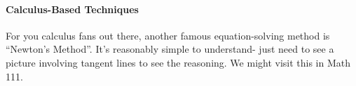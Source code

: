 \paragraph{Calculus-Based Techniques} For you calculus fans out there, another famous equation-solving method is ``Newton's Method''.  It's reasonably simple to understand- just need to see a picture involving tangent lines to see the reasoning. We might visit this in Math 111.
